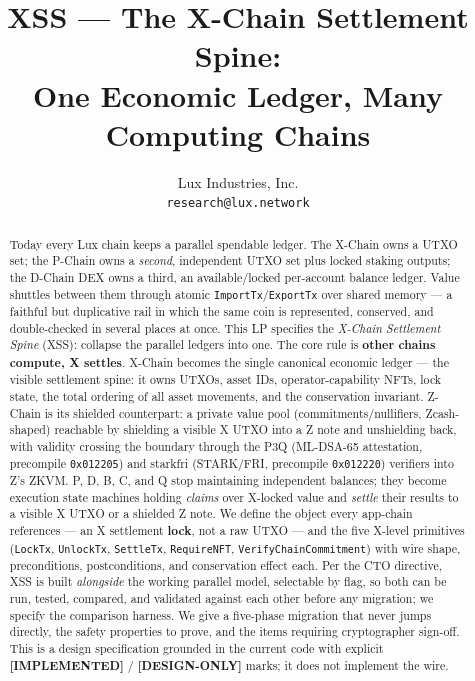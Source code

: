 \documentclass[11pt,a4paper]{article}
\title{XSS --- The X-Chain Settlement Spine:\\
       One Economic Ledger, Many Computing Chains}
\author{Lux Industries, Inc. \\
        \texttt{research@lux.network}}
\date{}
\begin{document}
\luxcoverpage

\begin{abstract}
Today every Lux chain keeps a parallel spendable ledger. The X-Chain
owns a UTXO set; the P-Chain owns a \emph{second}, independent UTXO set
plus locked staking outputs; the D-Chain DEX owns a third, an
available/locked per-account balance ledger. Value shuttles between
them through atomic \texttt{ImportTx}/\texttt{ExportTx} over shared
memory --- a faithful but duplicative rail in which the same coin is
represented, conserved, and double-checked in several places at once.
This LP specifies the \emph{X-Chain Settlement Spine} (XSS): collapse
the parallel ledgers into one. The core rule is \textbf{other chains
compute, X settles}. X-Chain becomes the single canonical economic
ledger --- the visible settlement spine: it owns UTXOs, asset IDs,
operator-capability NFTs, lock state, the total ordering of all asset
movements, and the conservation invariant. Z-Chain is its shielded
counterpart: a private value pool (commitments/nullifiers, Zcash-shaped)
reachable by shielding a visible X UTXO into a Z note and unshielding
back, with validity crossing the boundary through the P3Q
(ML-DSA-65 attestation, precompile \texttt{0x012205}) and starkfri
(STARK/FRI, precompile \texttt{0x012220}) verifiers into Z's ZKVM.
P, D, B, C, and Q stop maintaining independent balances; they become
execution state machines holding \emph{claims} over X-locked value and
\emph{settle} their results to a visible X UTXO or a shielded Z note.
We define the object every app-chain references --- an X settlement
\textbf{lock}, not a raw UTXO --- and the five X-level primitives
(\texttt{LockTx}, \texttt{UnlockTx}, \texttt{SettleTx},
\texttt{RequireNFT}, \texttt{VerifyChainCommitment}) with wire shape,
preconditions, postconditions, and conservation effect each. Per the
CTO directive, XSS is built \emph{alongside} the working parallel model,
selectable by flag, so both can be run, tested, compared, and validated
against each other before any migration; we specify the comparison
harness. We give a five-phase migration that never jumps directly, the
safety properties to prove, and the items requiring cryptographer
sign-off. This is a design specification grounded in the current code
with explicit \textbf{[IMPLEMENTED]} / \textbf{[DESIGN-ONLY]} marks; it
does not implement the wire.
\end{abstract}

\tableofcontents
\newpage

















\end{document}
